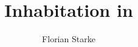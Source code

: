 \documentclass[]{scrartcl}
\title{Inhabitation in \lambdaTwo{}}
\author{Florian Starke}
\theoremstyle{definition}
\begin{document}
	\maketitle
	\begin{sloppypar}
	
	
	
	
	
	\end{sloppypar}
\end{document}
